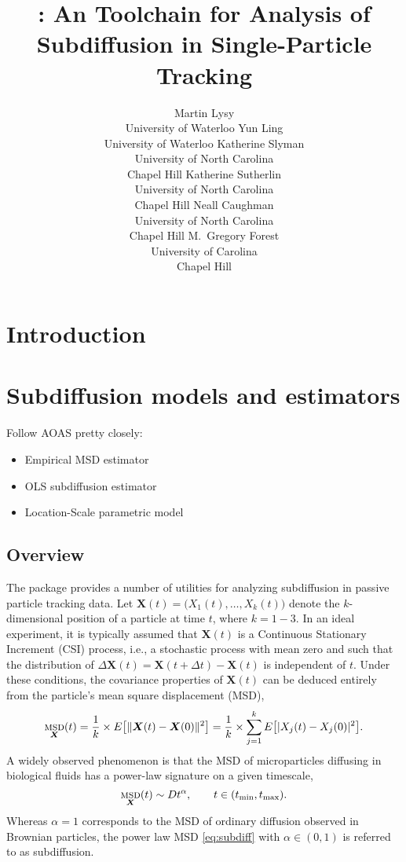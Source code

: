 \documentclass[article]{jss}
\author{
  Martin Lysy\\University of Waterloo
  \And
  Yun Ling\\University of Waterloo
  \AND
  Katherine Slyman\\University of North Carolina\\Chapel Hill
  \And
  Katherine Sutherlin\\University of North Carolina\\Chapel Hill
  \AND
  Neall Caughman\\University of North Carolina\\Chapel Hill
  \And
  M.~Gregory Forest\\University of Carolina\\Chapel Hill
}
\title{\pkg{subdiff}: An \proglang{R} Toolchain for Analysis of Subdiffusion in Single-Particle Tracking}
\newcommand{\nd}{k}
\newcommand{\XX}{\bm{X}}
\newcommand{\dXX}{\Delta\XX}
\newcommand{\dt}{\Delta t}
\newcommand{\tmin}{t_{\textnormal{min}}}
\newcommand{\tmax}{t_{\textnormal{max}}}
\DeclareMathOperator{\msd}{\textsc{msd}}
\begin{document}

\section{Introduction} \label{sec:intro}


\section{Subdiffusion models and estimators}

Follow AOAS pretty closely:
\begin{itemize}
\item Empirical MSD estimator
\item OLS subdiffusion estimator
\item Location-Scale parametric model
\end{itemize}

\subsection{Overview}

The  package provides a number of utilities for analyzing subdiffusion in passive particle tracking data.  Let $\XX(t) = \big(X_1(t), \ldots, X_k(t)\big)$ denote the $k$-dimensional position of a particle at time $t$, where $k = 1-3$.  In an ideal experiment, it is typically assumed that $\XX(t)$ is a Continuous Stationary Increment (CSI) process, i.e., a stochastic process with mean zero and such that the distribution of $\dXX(t) = \XX(t+\dt) - \XX(t)$ is independent of $t$.  Under these conditions, the covariance properties of $\XX(t)$ can be deduced entirely from the particle's mean square displacement (MSD),
\begin{equation}\label{eq:msd}
  \msd_{\XX}(t) = \frac 1 \nd \times E\bigl[\lVert \XX(t) - \XX(0) \rVert^2\bigr] = \frac 1 \nd \times \sum_{j=1}^\nd E\bigl[\lvert X_j(t) - X_j(0) \rvert^2\bigr].
\end{equation}
A widely observed phenomenon is that the MSD of microparticles diffusing in biological fluids has a power-law signature on a given timescale,
\begin{equation}
  \msd_{\XX}(t) \sim D t^\alpha, \qquad t \in (\tmin, \tmax).
  \label{eq:subdiff}
\end{equation}
Whereas $\alpha = 1$ corresponds to the MSD of ordinary diffusion observed in Brownian particles, the power law MSD \eqref{eq:subdiff} with $\alpha \in (0,1)$ is referred to as subdiffusion.  
\end{document}
